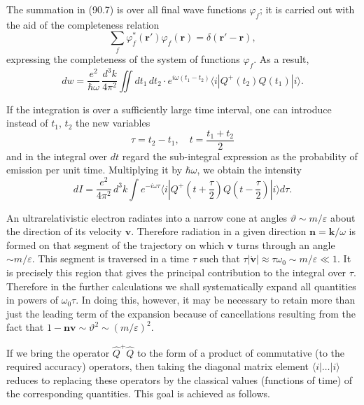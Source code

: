
The summation in (90.7) is over all final wave functions $\varphi_f$; it is carried out with the aid of the completeness relation
\[
\sum_f \varphi_f^*(\mathbf{r}')\varphi_f(\mathbf{r}) = \delta(\mathbf{r}' - \mathbf{r}),
\]
expressing the completeness of the system of functions $\varphi_f$. As a result,
\begin{equation}
dw = \frac{e^2}{\hbar\omega}\,\frac{d^3k}{4\pi^2}\iint dt_1\,dt_2\cdot e^{i\omega(t_1-t_2)}\langle i|Q^+(t_2)Q(t_1)|i\rangle.
\label{eq:90.9a}
\end{equation}

If the integration is over a sufficiently large time interval, one can introduce instead of $t_1$, $t_2$ the new variables
\[
\tau = t_2 - t_1, \quad t = \frac{t_1 + t_2}{2}
\]
and in the integral over $dt$ regard the sub-integral expression as the probability of emission per unit time. Multiplying it by $\hbar\omega$, we obtain the intensity
\begin{equation}
dI = \frac{e^2}{4\pi^2}\,d^3k \int e^{-i\omega\tau}\langle i|Q^+\!\left(t+\frac{\tau}{2}\right)Q\!\left(t-\frac{\tau}{2}\right)|i\rangle d\tau.
\label{eq:90.10}
\end{equation}

An ultrarelativistic electron radiates into a narrow cone at angles $\vartheta \sim m/\varepsilon$ about the direction of its velocity $\mathbf{v}$. Therefore radiation in a given direction $\mathbf{n} = \mathbf{k}/\omega$ is formed on that segment of the trajectory on which $\mathbf{v}$ turns through an angle $\sim m/\varepsilon$. This segment is traversed in a time $\tau$ such that $\tau|\dot{\mathbf{v}}| \approx \tau\omega_0 \sim m/\varepsilon \ll 1$. It is precisely this region that gives the principal contribution to the integral over $\tau$. Therefore in the further calculations we shall systematically expand all quantities in powers of $\omega_0\tau$. In doing this, however, it may be necessary to retain more than just the leading term of the expansion because of cancellations resulting from the fact that $1 - \mathbf{nv} \sim \vartheta^2 \sim (m/\varepsilon)^2$.

If we bring the operator $\hat{Q}^+\hat{Q}$ to the form of a product of commutative (to the required accuracy) operators, then taking the diagonal matrix element $\langle i|\ldots|i\rangle$ reduces to replacing these operators by the classical values (functions of time) of the corresponding quantities. This goal is achieved as follows.

